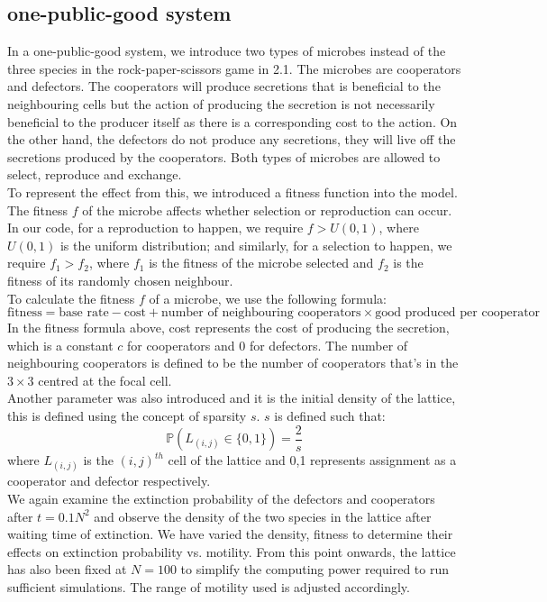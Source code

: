 \documentclass[11pt]{article}
\begin{document}
\subsection{one-public-good system}
In a one-public-good system, we introduce two types of microbes instead of the three species in the rock-paper-scissors game in 2.1. The microbes are cooperators and defectors. The cooperators will produce secretions that is beneficial to the neighbouring cells but the action of producing the secretion is not necessarily beneficial to the producer itself as there is a corresponding cost to the action. On the other hand, the defectors do not produce any secretions, they will live off the secretions produced by the cooperators. Both types of microbes are allowed to select, reproduce and exchange.\\
To represent the effect from this, we introduced a fitness function into the model. The fitness $f$ of the microbe affects whether selection or reproduction can occur. In our code, for a reproduction to happen, we require $f > U(0,1)$, where $U(0,1)$ is the uniform distribution; and similarly, for a selection to happen, we require $f_1 > f_2$, where $f_1$ is the fitness of the microbe selected and $f_2$ is the fitness of its randomly chosen neighbour.\\
To calculate the fitness $f$ of a microbe, we use the following formula:
\[\text{fitness} = \text{base rate} - \text{cost} + \text{number of neighbouring cooperators} \times \text{good produced per cooperator}\]
In the fitness formula above, cost represents the cost of producing the secretion, which is a constant $c$ for cooperators and $0$ for defectors. The number of neighbouring cooperators is defined to be the number of cooperators that's in the $3\times 3$ centred at the focal cell.\\
 Another parameter was also introduced and it is the initial density of the lattice, this is defined using the concept of sparsity $s$. $s$ is defined such that:
\[\mathds{P}(L_{(i,j)}\in\{0,1\}) = \frac{2}{s}\]
where $L_{(i,j)}$ is the $(i,j)^{th}$ cell of the lattice and 0,1 represents assignment as a cooperator and defector respectively.\\
We again examine the extinction probability of the defectors and cooperators after $t=0.1N^2$ and observe the density of the two species in the lattice after waiting time of extinction. We have varied the density, fitness to determine their effects on extinction probability vs. motility. From this point onwards, the lattice has also been fixed at $N=100$ to simplify the computing power required to run sufficient simulations. The range of motility used is adjusted accordingly.
\end{document}

